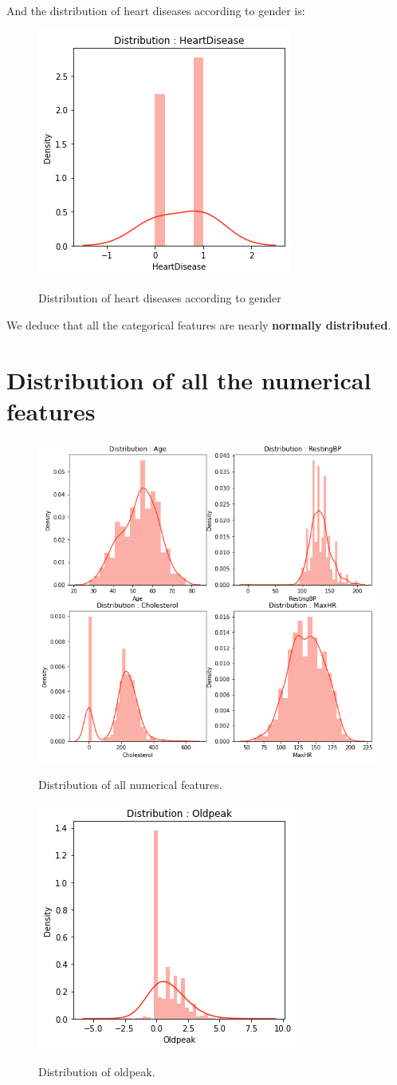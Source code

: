 And the distribution of heart diseases according to gender is:
\begin{figure}[!htpb]
    \centering
    \includegraphics[width=0.3\linewidth]{Figures/Outputs/distr-of-catf2.png}
    \label{Distribution of heart diseases according to gender.}
    \caption{Distribution of heart diseases according to gender}
\end{figure}

We deduce that all the categorical features are nearly \textbf{normally distributed}.
\newpage 
\section{Distribution of all the numerical features}
\begin{figure}[!htpb]
    \centering
    \includegraphics[width=0.7\linewidth]{Figures/Outputs/dist-num-1.png}
    \label{Distribution of all numerical features}
    \caption{Distribution of all numerical features.}
\end{figure}
\begin{figure}[!htpb]
    \centering
    \includegraphics[width=0.3\linewidth]{Figures/Outputs/dist-num-2.png}
    \label{Distribution of oldpeak}
    \caption{Distribution of oldpeak.}
\end{figure}

